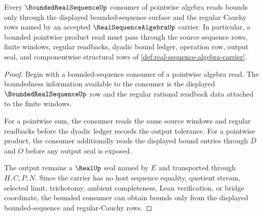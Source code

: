 \begin{theorem}\label{thm:real-sequence-algebra-bounded-consumer}
Every $\BoundedRealSequenceUp$ consumer of pointwise algebra reads bounds only through the displayed bounded-sequence surface and the regular Cauchy rows named by an accepted $\RealSequenceAlgebraUp$ carrier. In particular, a bounded pointwise product read must pass through the source sequence rows, finite windows, regular readbacks, dyadic bound ledger, operation row, output seal, and componentwise structural rows of \autoref{def:real-sequence-algebra-carrier}.
\end{theorem}
\begin{proof}
Begin with a bounded-sequence consumer of a pointwise algebra read. The boundedness information available to the consumer is the displayed $\BoundedRealSequenceUp$ row and the regular rational readback data attached to the finite windows.

For a pointwise sum, the consumer reads the same source windows and regular readbacks before the dyadic ledger records the output tolerance. For a pointwise product, the consumer additionally reads the displayed bound entries through $D$ and $O$ before any output seal is exposed.

The output remains a $\RealUp$ seal named by $E$ and transported through $H,C,P,N$. Since the carrier has no host sequence equality, quotient stream, selected limit, trichotomy, ambient completeness, Lean verification, or bridge coordinate, the bounded consumer can obtain bounds only from the displayed bounded-sequence and regular-Cauchy rows.
\end{proof}

